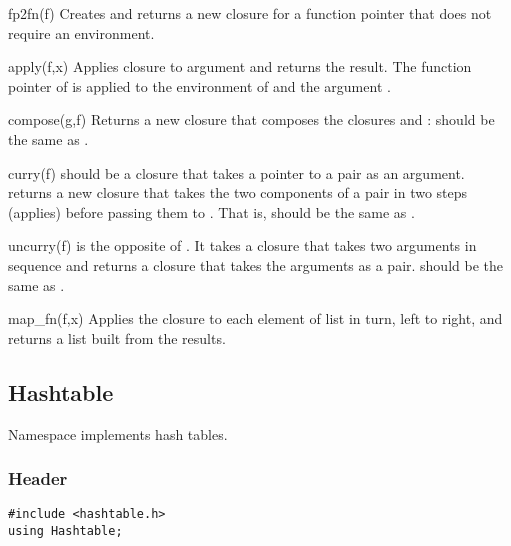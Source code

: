 \begin{defun}{fp2fn}{(f)}
Creates and returns a new closure for a function pointer that does not
require an environment.
\end{defun}

\begin{defun}{apply}{(f,x)}
Applies closure  to argument  and returns the result.  The
function pointer of  is applied to the environment of  and
the argument .
\end{defun}

\begin{defun}{compose}{(g,f)}
Returns a new closure that composes the closures  and :
 should be the same as
.
\end{defun}

\begin{defun}{curry}{(f)}
 should be a closure that takes a pointer to a pair as an
argument.   returns a new closure that takes the
two components of a pair in two steps (applies) before passing them to
.  That is,  should be
the same as .
\end{defun}

\begin{defun}{uncurry}{(f)}
 is the opposite of .  It takes a closure that
takes two arguments in sequence and returns a closure that takes the
arguments as a pair.  
should be the same as .
\end{defun}

\begin{defun}{map_fn}{(f,x)}
Applies the closure  to each element of list  in turn,
left to right, and returns a list built from the results.
\end{defun}

\subsection{Hashtable}

Namespace  implements hash tables.

\subsubsection*{Header}
\begin{verbatim}
#include <hashtable.h>
using Hashtable;
\end{verbatim}


